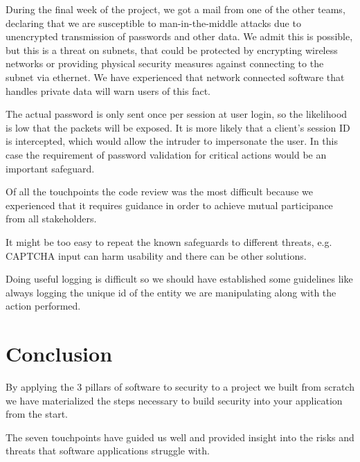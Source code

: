 \documentclass[a4paper]{article}
\begin{document}
During the final week of the project, we got a mail from one of the other teams, declaring that we are susceptible to man-in-the-middle attacks due to unencrypted transmission of passwords and other data. We admit this is possible, but this is a threat on subnets, that could be protected by encrypting wireless networks or providing physical security measures against connecting to the subnet via ethernet. We have experienced that network connected software that handles private data will warn users of this fact.

The actual password is only sent once per session at user login, so the likelihood is low that the packets will be exposed. It is more likely that a client's session ID is intercepted, which would allow the intruder to impersonate the user. In this case the requirement of password validation for critical actions would be an important safeguard.

Of all the touchpoints the code review was the most difficult because we experienced that it requires guidance in order to achieve mutual participance from all stakeholders.

It might be too easy to repeat the known safeguards to different threats, e.g. CAPTCHA input can harm usability and there can be other solutions. 

Doing useful logging is difficult so we should have established some guidelines like always logging the unique id of the entity we are manipulating along with the action performed.


\section{Conclusion}

By applying the 3 pillars of software to security to a project we built from scratch we have materialized the steps necessary to build security into your application from the start.

The seven touchpoints have guided us well and provided insight into the risks and threats that software applications struggle with.

\end{document}
